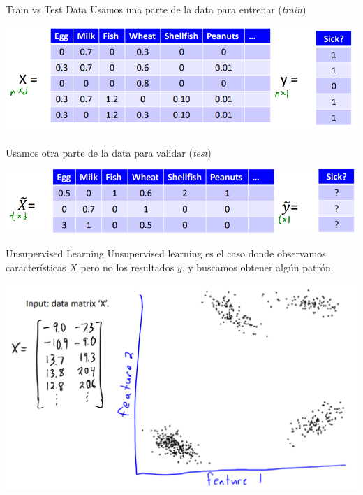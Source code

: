 \documentclass[11pt,handout,aspectratio=169]{beamer}
\begin{document}
\begin{frame}{Train vs Test Data}
Usamos una parte de la data para entrenar (\textit{train})
\begin{center}
\includegraphics[scale=0.5]{train_data.png}
\end{center}
\vspace{0.5cm}

Usamos otra parte de la data para validar (\textit{test})
\begin{center}
\includegraphics[scale=0.5]{test_data.png}
\end{center}

\end{frame}

\begin{frame}{Unsupervised Learning}
Unsupervised learning es el caso donde observamos características $X$ pero no los resultados $y$, y buscamos obtener algún patrón.

\begin{center}
\includegraphics[scale=0.5]{unsupervised.png}
\end{center}

\end{frame}
\end{document}
